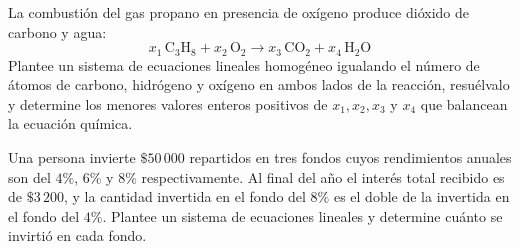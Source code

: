 \begin{prob} La combustión del gas propano en presencia de oxígeno produce dióxido de carbono y agua:
\[
x_1\,\text{C}_3\text{H}_8 + x_2\,\text{O}_2 \longrightarrow x_3\,\text{CO}_2 + x_4\,\text{H}_2\text{O}
\]
Plantee un sistema de ecuaciones lineales homogéneo igualando el número de átomos de carbono, hidrógeno y oxígeno en ambos lados de la reacción, resuélvalo y determine los menores valores enteros positivos de $x_1, x_2, x_3$ y $x_4$ que balancean la ecuación química.
\end{prob}

\begin{prob} Una persona invierte $\$50\,000$ repartidos en tres fondos cuyos rendimientos anuales son del $4\%$, $6\%$ y $8\%$ respectivamente. Al final del año el interés total recibido es de $\$3\,200$, y la cantidad invertida en el fondo del $8\%$ es el doble de la invertida en el fondo del $4\%$. Plantee un sistema de ecuaciones lineales y determine cuánto se invirtió en cada fondo.
\end{prob}

